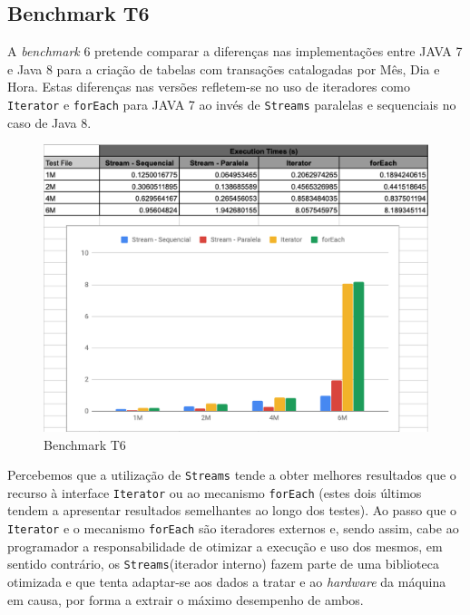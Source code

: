 \documentclass{article}
\begin{document}
\subsection{Benchmark T6}
A \textit{benchmark} 6 pretende comparar a diferenças nas implementações entre
JAVA 7 e Java 8 para a criação de tabelas com transações catalogadas por Mês, Dia e Hora.
Estas diferenças nas versões refletem-se no uso de iteradores como \texttt{Iterator} e 
\texttt{forEach} para JAVA 7 ao invés de \texttt{Streams} paralelas e sequenciais no caso de Java 8.
\begin{figure}[H]
    \centering
    \includegraphics[width=15cm]{Pictures/T6.png}
    \caption{Benchmark T6}
\end{figure}
Percebemos que a utilização de \texttt{Streams} tende a obter melhores resultados que o recurso à interface \texttt{Iterator} ou ao mecanismo \texttt{forEach} (estes dois últimos tendem a apresentar resultados semelhantes ao longo dos testes). Ao passo que o \texttt{Iterator} e o mecanismo \texttt{forEach} são iteradores externos e, sendo assim, cabe ao programador a responsabilidade de otimizar a execução e uso dos mesmos, em sentido contrário, os \texttt{Streams}(iterador interno) fazem parte de uma biblioteca otimizada e que tenta adaptar-se aos dados a tratar e ao \textit{hardware} da máquina em causa, por forma a extrair o máximo desempenho de ambos.

\newpage
\end{document}
